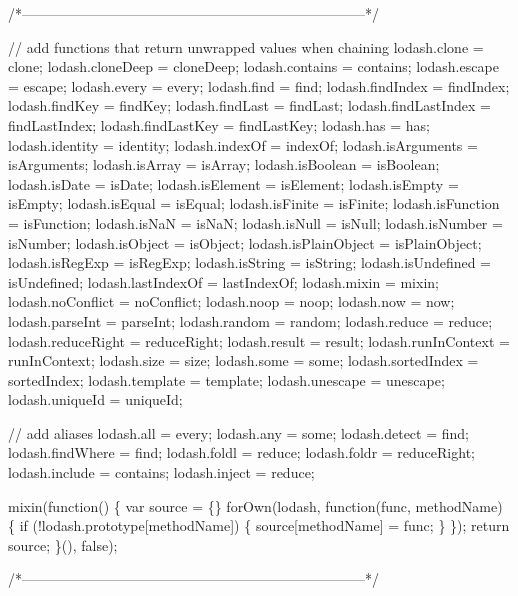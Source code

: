 \begin{DoxyCodeInclude}
    \textcolor{comment}{/*--------------------------------------------------------------------------*/}

    \textcolor{comment}{// add functions that return unwrapped values when chaining}
    lodash.clone = clone;
    lodash.cloneDeep = cloneDeep;
    lodash.contains = contains;
    lodash.escape = escape;
    lodash.every = every;
    lodash.find = find;
    lodash.findIndex = findIndex;
    lodash.findKey = findKey;
    lodash.findLast = findLast;
    lodash.findLastIndex = findLastIndex;
    lodash.findLastKey = findLastKey;
    lodash.has = has;
    lodash.identity = identity;
    lodash.indexOf = indexOf;
    lodash.isArguments = isArguments;
    lodash.isArray = isArray;
    lodash.isBoolean = isBoolean;
    lodash.isDate = isDate;
    lodash.isElement = isElement;
    lodash.isEmpty = isEmpty;
    lodash.isEqual = isEqual;
    lodash.isFinite = isFinite;
    lodash.isFunction = isFunction;
    lodash.isNaN = isNaN;
    lodash.isNull = isNull;
    lodash.isNumber = isNumber;
    lodash.isObject = isObject;
    lodash.isPlainObject = isPlainObject;
    lodash.isRegExp = isRegExp;
    lodash.isString = isString;
    lodash.isUndefined = isUndefined;
    lodash.lastIndexOf = lastIndexOf;
    lodash.mixin = mixin;
    lodash.noConflict = noConflict;
    lodash.noop = noop;
    lodash.now = now;
    lodash.parseInt = parseInt;
    lodash.random = random;
    lodash.reduce = reduce;
    lodash.reduceRight = reduceRight;
    lodash.result = result;
    lodash.runInContext = runInContext;
    lodash.size = size;
    lodash.some = some;
    lodash.sortedIndex = sortedIndex;
    lodash.template = \textcolor{keyword}{template};
    lodash.unescape = unescape;
    lodash.uniqueId = uniqueId;

    \textcolor{comment}{// add aliases}
    lodash.all = every;
    lodash.any = some;
    lodash.detect = find;
    lodash.findWhere = find;
    lodash.foldl = reduce;
    lodash.foldr = reduceRight;
    lodash.include = contains;
    lodash.inject = reduce;

    mixin(\textcolor{keyword}{function}() \{
      var source = \{\}
      forOwn(lodash, \textcolor{keyword}{function}(func, methodName) \{
        \textcolor{keywordflow}{if} (!lodash.prototype[methodName]) \{
          source[methodName] = func;
        \}
      \});
      \textcolor{keywordflow}{return} source;
    \}(), \textcolor{keyword}{false});

    \textcolor{comment}{/*--------------------------------------------------------------------------*/}


\end{DoxyCodeInclude}

